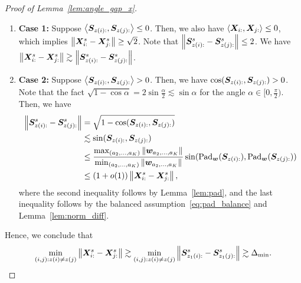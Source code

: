 \documentclass[lettersize,onecolumn,journal]{IEEEtran}
\theoremstyle{definition}
\newtheorem{lem}{Lemma}
\theoremstyle{definition}
\newcommand{\ang}[1]{\left\langle#1\right\rangle}
\begin{document}
\begin{proof}[Proof of Lemma~\ref{lem:angle_gap_x}]
\begin{enumerate}
    \item \textbf{Case 1:} Suppose $\ang{\mS_{z(i):}, \mS_{z(j):}} \leq 0$. Then, we also have $\ang{\mX_{i:},\mX_{j:}} \leq 0$, which implies $\left\lVert\bm X_{i:}^s -  \bm X_{j:}^s\right\rVert \geq \sqrt{2}$. Note that $\left\lVert\bm S_{z(i):}^s - \bm S_{z(j):}^s\right\rVert \leq 2$. We have $\left\lVert\bm X_{i:}^s -  \bm X_{j:}^s\right\rVert \gtrsim \left\lVert\bm S_{z(i):}^s - \bm S_{z(j):}^s\right\rVert$.
    \item \textbf{Case 2:} Suppose $\ang{\mS_{z(i):}, \mS_{z(j):}} > 0$. Then, we have $\cos(\bm S_{z(i):}, \bm S_{z(j):}) > 0$. Note that the fact $\sqrt{1 - \cos \alpha} = 2 \sin \frac{\alpha}{2} \lesssim \sin \alpha$ for the angle $\alpha \in [0, \frac{\pi}{2})$. Then, we have 
    \begin{align}
        \left\lVert\bm S_{z(i):}^s - \bm S_{z(j):}^s\right\rVert &= \sqrt{ 1 - \cos(\bm S_{z(i):}, \bm S_{z(j):})}  \\
        & \lesssim \sin (\bm S_{z(i):}, \bm S_{z(j):})\\
        & \leq \frac{ \max_{(a_2,\ldots, a_K)} \left\lVert\bm{w}_{a_2,\ldots, a_K}\right\rVert }{  \min_{(a_2,\ldots, a_K)} \left\lVert\bm{w}_{a_2,\ldots, a_K}\right\rVert }  \sin ( \text{Pad}_{\bm{w}} (\bm S_{z(i):}), \text{Pad}_{\bm{w}}(\bm S_{z(j):})) \\
        & \leq (1 + o(1)) \left\lVert\bm X_{i:}^s -  \bm X_{j:}^s\right\rVert,
    \end{align}
    where the second inequality follows by Lemma~\ref{lem:pad}, and the last inequality follows by the balanced assumption~\eqref{eq:pad_balance} and Lemma~\ref{lem:norm_diff}.
\end{enumerate}

Hence, we conclude that 
\begin{equation}
   \min_{(i,j): z(i) \neq z(j)} \left\lVert\bm X_{i:}^s - \bm X_{j:}^s\right\rVert \gtrsim \min_{(i,j): z(i) \neq z(j)}  \left\lVert\bm S_{z_1(i):}^s - \bm S_{z_1(j):}^s\right\rVert \gtrsim  \Delta_{\min}.
\end{equation}

\end{proof}

\end{document}
